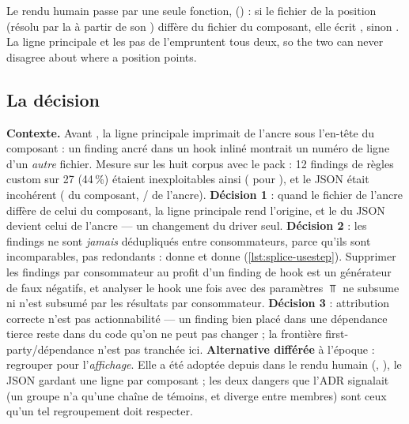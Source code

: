 Le rendu humain passe par une seule fonction,  () : si le fichier de la position (résolu par la  à partir de son ) diffère du fichier du composant, elle écrit , sinon . La ligne principale et les pas de  l'empruntent tous deux, \og so the two can never disagree about where a position points\fg{}.

\subsection{La décision}

\begin{decision}
\textbf{Contexte.} Avant , la ligne principale imprimait  de l'ancre sous l'en-tête du composant : un finding ancré dans un hook inliné montrait un numéro de ligne d'un \emph{autre} fichier. Mesure sur les huit corpus avec le pack  : 12 findings de règles custom sur 27 (44\,\%) étaient inexploitables ainsi ( pour ), et le JSON était incohérent ( du composant, / de l'ancre). \textbf{Décision 1} : quand le fichier de l'ancre diffère de celui du composant, la ligne principale rend l'origine, et le  du JSON devient celui de l'ancre --- un changement du driver seul. \textbf{Décision 2} : les findings ne sont \emph{jamais} dédupliqués entre consommateurs, parce qu'ils sont incomparables, pas redondants :  donne  et  donne  (\cref{lst:splice-usestep}). Supprimer les findings par consommateur au profit d'un finding de hook est un générateur de faux négatifs, et analyser le hook une fois avec des paramètres $\Top$ ne subsume ni n'est subsumé par les résultats par consommateur. \textbf{Décision 3} : attribution correcte n'est pas actionnabilité --- un finding bien placé dans une dépendance tierce reste dans du code qu'on ne peut pas changer ; la frontière first-party/dépendance n'est pas tranchée ici. \textbf{Alternative différée} à l'époque : regrouper pour l'\emph{affichage}. Elle a été adoptée depuis dans le rendu humain (, \og [in 3 components]\fg{}), le JSON gardant une ligne par composant ; les deux dangers que l'ADR signalait (un groupe n'a qu'une chaîne de témoins, et \code{[hook:N]} diverge entre membres) sont ceux qu'un tel regroupement doit respecter.
\end{decision}

